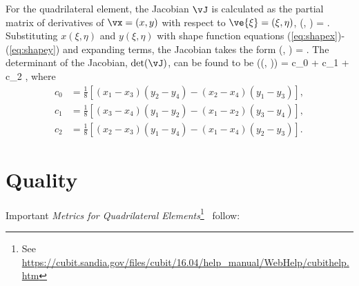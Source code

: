 \documentclass[14pt,letterpaper,fleqn]{extreport}
\begin{document}
For the quadrilateral element, the Jacobian $\vJ$ is calculated as 
the partial matrix of derivatives of $\vx = (x, y)$ with 
respect to $\ve{\xi} = (\xi, \eta)$, 
\be 
 \vJ(\xi, \eta)  
 \left[
  \frac{\partial \vx}{\partial \ve{\xi}}
 \right]
 = 
 .
\ee 
Substituting $x(\xi, \eta)$ and $y(\xi, \eta)$ with shape function equations
(\ref{eq:shapex})-(\ref{eq:shapey}) and expanding terms,  the Jacobian takes 
the form 
\be 
 \vJ(\xi, \eta) =  
  \left[ 
  \begin{tabular}{cc}
    $x_1$ & $y_1$ \\
    $x_2$ & $y_2$ \\
    $x_3$ & $y_3$ \\
    $x_4$ & $y_4$ \\
  \end{tabular}
  \right].
\ee 
The determinant of the Jacobian, $\det(\vJ)$, can be found to be 
\be 
\det(\vJ\left(\xi, \eta)\right) = c_0 + c_1 \xi + c_2 \eta,
\ee 
where
\begin{align}
  c_0 & = \frac{1}{8} \left[(x_1 - x_3) (y_2 - y_4) - (x_2 - x_4) (y_1 - y_3) \right], \\
  c_1 & = \frac{1}{8} \left[(x_3 - x_4) (y_1 - y_2) - (x_1 - x_2) (y_3 - y_4) \right], \\
  c_2 & = \frac{1}{8} \left[(x_2 - x_3) (y_1 - y_4) - (x_1 - x_4) (y_2 - y_3) \right].
\end{align}

\clearpage

\section{Quality}

Important {\em Metrics for Quadrilateral 
Elements}\footnote{See \href{link}{https://cubit.sandia.gov/files/cubit/16.04/help\_manual/WebHelp/cubithelp.htm}
}~%
follow:
\end{document}
